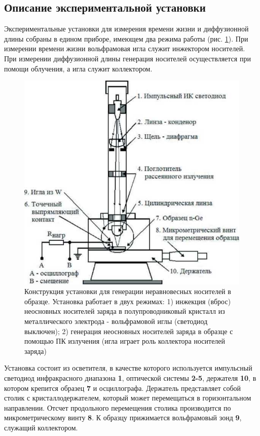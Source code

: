 \subsection{Описание экспериментальной установки}

Экспериментальные установки для измерения времени жизни и диффузионной длины собраны в едином приборе, имеющем два режима работы (рис.  \ref{fig:figure13}). При измерении времени жизни вольфрамовая игла служит инжектором носителей. При измерении диффузионной длины генерация носителей осуществляется при помощи облучения, а игла служит коллектором.
\begin{figure}[H]
	\centering
	\includegraphics[]{img/14}
	\caption{Конструкция установки для генерации неравновесных носителей в образце. Установка работает в двух режимах: 1) инжекция (вброс) неосновных носителей заряда в полупроводниковый кристалл из металлического электрода - вольфрамовой иглы (светодиод выключен); 2) генерация неосновных носителей заряда в образце с помощью ПК излучения (игла играет роль коллектора носителей заряда)
}
	\label{fig:figure13}
\end{figure}


Установка состоит из осветителя, в качестве которого используется импульсный светодиод инфракрасного диапазона \textbf{1}, оптической системы \textbf{2-5}, держателя \textbf{10}, в котором крепится образец \textbf{7} и осциллографа. Держатель представляет собой столик с кристаллодержателем, который может перемещаться в горизонтальном направлении. Отсчет продольного перемещения столика производится по микрометрическому винту \textbf{8}. К образцу прижимается вольфрамовый зонд \textbf{9}, служащий коллектором.


